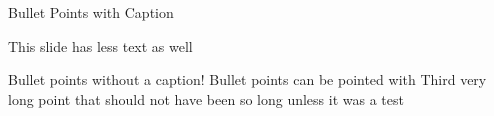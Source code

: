 \begin{frame}{Bullet Points with Caption}
 \begin{fullpageitemize}
  \item \begin{center}\end{center}
  \item \begin{center}This slide has less text as well\end{center}
 \end{fullpageitemize}
\end{frame}

\begin{frame}{}
 \vfill
 \begin{fullpageitemize}
  \itemR Bullet points without a caption!
  \itemR Bullet points can be pointed with \rtarrow
  \itemR Third very long point that should not have been so long unless it was a test
 \end{fullpageitemize}
\end{frame}


